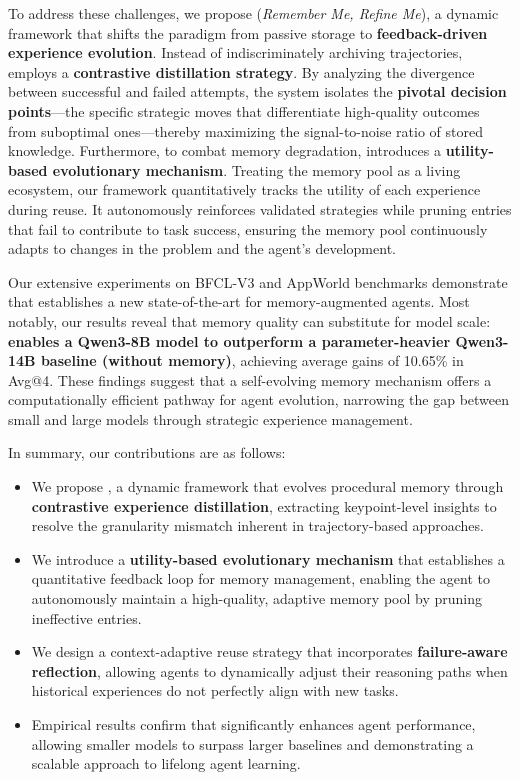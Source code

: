 To address these challenges, we propose \textbf{\ours} (\textit{Remember Me, Refine Me}), a dynamic framework that shifts the paradigm from passive storage to \textbf{feedback-driven experience evolution}. 
Instead of indiscriminately archiving trajectories, {\ours} employs a \textbf{contrastive distillation strategy}. By analyzing the divergence between successful and failed attempts, the system isolates the \textbf{pivotal decision points}—the specific strategic moves that differentiate high-quality outcomes from suboptimal ones—thereby maximizing the signal-to-noise ratio of stored knowledge.
Furthermore, to combat memory degradation, {\ours} introduces a \textbf{utility-based evolutionary mechanism}. 
Treating the memory pool as a living ecosystem, our framework quantitatively tracks the utility of each experience during reuse. It autonomously reinforces validated strategies while pruning entries that fail to contribute to task success, ensuring the memory pool continuously adapts to changes in the problem and the agent's development.

Our extensive experiments on BFCL-V3 and AppWorld benchmarks demonstrate that {\ours} establishes a new state-of-the-art for memory-augmented agents. 
Most notably, our results reveal that memory quality can substitute for model scale: \textbf{{\ours} enables a Qwen3-8B model to outperform a parameter-heavier Qwen3-14B baseline (without memory)}, achieving average gains of 10.65\% in Avg@4. 
These findings suggest that a self-evolving memory mechanism offers a computationally efficient pathway for agent evolution, narrowing the gap between small and large models through strategic experience management.

In summary, our contributions are as follows:
\begin{itemize}[leftmargin=12pt,topsep=2pt,itemsep=-2pt]
    \item We propose \textbf{\ours}, a dynamic framework that evolves procedural memory through \textbf{contrastive experience distillation}, extracting keypoint-level insights to resolve the granularity mismatch inherent in trajectory-based approaches.
    \item We introduce a \textbf{utility-based evolutionary mechanism} that establishes a quantitative feedback loop for memory management, enabling the agent to autonomously maintain a high-quality, adaptive memory pool by pruning ineffective entries.
    \item We design a context-adaptive reuse strategy that incorporates \textbf{failure-aware reflection}, allowing agents to dynamically adjust their reasoning paths when historical experiences do not perfectly align with new tasks.
    \item Empirical results confirm that {\ours} significantly enhances agent performance, allowing smaller models to surpass larger baselines and demonstrating a scalable approach to lifelong agent learning.
\end{itemize}
